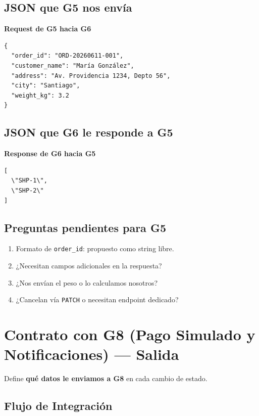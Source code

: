 \documentclass[11pt, a4paper]{article}
\newcommand{\contractheader}[1]{%
  \noindent\colorbox{primary!10}{%
    \parbox{\dimexpr\textwidth-2\fboxsep}{%
      \textbf{\faFileCode\quad #1}%
    }%
  }
  \vspace{0.3cm}
}
\begin{document}
\subsection{JSON que G5 nos envía}

\contractheader{Request de G5 hacia G6}

\begin{lstlisting}
{
  "order_id": "ORD-20260611-001",
  "customer_name": "María González",
  "address": "Av. Providencia 1234, Depto 56",
  "city": "Santiago",
  "weight_kg": 3.2
}
\end{lstlisting}

\subsection{JSON que G6 le responde a G5}

\contractheader{Response de G6 hacia G5}

\begin{lstlisting}
[
  \"SHP-1\",
  \"SHP-2\"
]
\end{lstlisting}

\subsection{Preguntas pendientes para G5}

\begin{warningbox}[title={\faExclamationCircle\quad Confirmar con G5}]
\begin{enumerate}[noitemsep]
  \item Formato de \texttt{order\_id}: propuesto como string libre.
  \item ¿Necesitan campos adicionales en la respuesta?
  \item ¿Nos envían el peso o lo calculamos nosotros?
  \item ¿Cancelan vía \texttt{PATCH} o necesitan endpoint dedicado?
\end{enumerate}
\end{warningbox}


\section{Contrato con G8 (Pago Simulado y Notificaciones) --- Salida}
\label{sec:contrato-g8}

Define \textbf{qué datos le enviamos a G8} en cada cambio de estado.

\subsection{Flujo de Integración}
\end{document}
